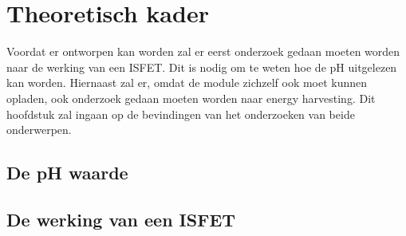 \section{Theoretisch kader}
Voordat er ontworpen kan worden zal er eerst onderzoek gedaan moeten worden naar de werking van een ISFET. Dit is nodig om te weten hoe de pH uitgelezen kan worden.
Hiernaast zal er, omdat de module zichzelf ook moet kunnen opladen, ook onderzoek gedaan moeten worden naar energy harvesting.
Dit hoofdstuk zal ingaan op de bevindingen van het onderzoeken van beide onderwerpen.

\subsection{De pH waarde}\label{sec:ph}


\subsection{De werking van een ISFET}\label{sec:werkingISFET}






